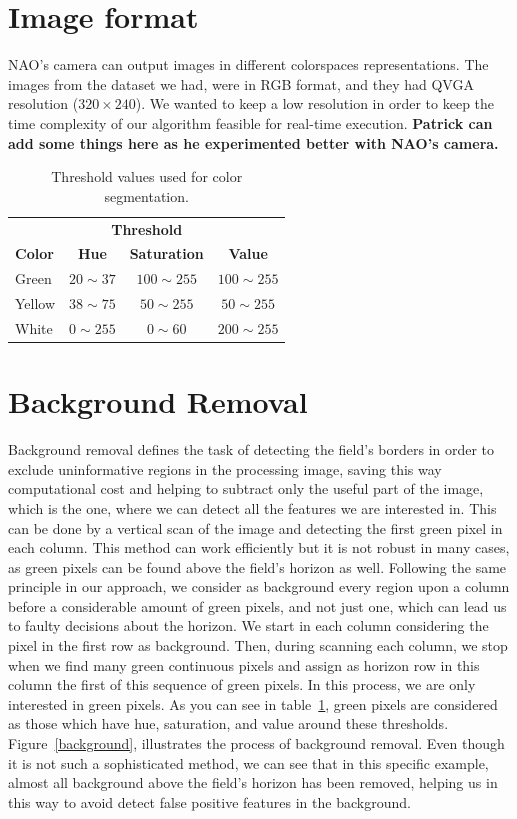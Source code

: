 \documentclass[	DIV=calc,%
							paper=a4,%
							fontsize=11pt,%
							twocolumn]{scrartcl}	 					%
\begin{document}
\section{Image format}
NAO's camera can output images in different colorspaces representations. The images from the dataset we had, were in RGB format, and they had QVGA resolution ($320 \times 240$). We wanted to keep a low resolution in order to keep the time complexity of our algorithm feasible for real-time execution. \textbf{Patrick can add some things here as he experimented better with NAO's camera.}

\begin{table}
\begin{center}
\caption{Threshold values used for color segmentation.}
\label{thresholdHSV}
\begin{tabular}{lccc}
\toprule
\multicolumn{4}{c}{\textbf{Threshold}} \\
\cmidrule(r){2-4}
\textbf{Color}   & \textbf{Hue} & \textbf{Saturation} & \textbf{Value} \\
\midrule
Green      & $20 \sim 37$    & $100 \sim 255$    & $100 \sim 255$    \\
Yellow      & $38 \sim 75$    & $50 \sim 255$    & $50 \sim 255$    \\
White     & $0 \sim 255$    & $0 \sim 60$    & $200 \sim 255$    \\
\bottomrule
\end{tabular}
\end{center}
\end{table}

\section{Background Removal}
Background removal defines the task of detecting the field's borders in order to exclude uninformative regions in the processing image, saving this way computational cost and helping to subtract only the useful part of the image, which is the one, where we can detect all the features we are interested in. This can be done by a vertical scan of the image and detecting the first green pixel in each column. This method can work efficiently but it is not robust in many cases, as green pixels can be found above the field's horizon as well. Following the same principle in our approach, we consider as background every region upon a column before a considerable amount of green pixels, and not just one, which can lead us to faulty decisions about the horizon. We start in each column considering the pixel in the first row as background. Then, during scanning each column, we stop when we find many green continuous pixels and assign as horizon row in this column the first of this sequence of green pixels. In this process, we are only interested in green pixels. As you can see in table~\ref{thresholdHSV}, green pixels are considered as those which have hue, saturation, and value around these thresholds. Figure~\ref{background}, illustrates the process of background removal. Even though it is not such a sophisticated method, we can see that in this specific example, almost all background above the field's horizon has been removed, helping us in this way to avoid detect false positive features in the background.
\end{document}
